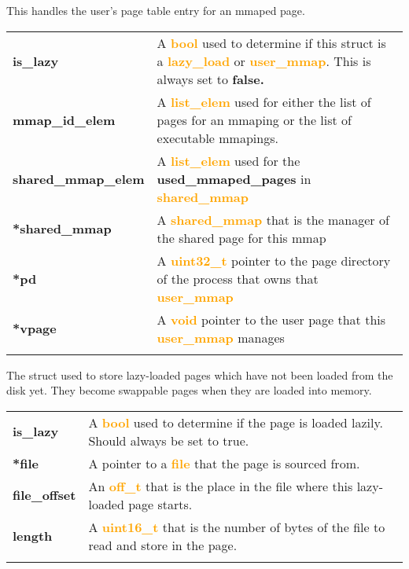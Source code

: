 \documentclass{report}
\newcommand{\file}[1]{\textcolor{YellowGreen}{\textbf{#1}}}
\newcommand{\struct}[1]{\textcolor{orange}{\textbf{#1}}}
\newcommand{\var}[1]{\textcolor{RoyalPurple}{\textbf{#1}}}
\newcommand{\const}[1]{\textcolor{BrickRed}{\textbf{#1}}}
\newcommand{\pintoscode}[4]{}
\newcommand{\pintosfile}[3]{\pintoscode{#1}{#2}{\file{#3}}{#3}}
\begin{document}
				\pintosfile{60}{67}{mmap.c}
				This handles the user's page table entry for an mmaped page. \\
				\begin{center}
					\begin{tabular}{l p{10cm}}
							\vspace*{2mm}
							\var{is\_lazy}            & A \struct{bool} used to determine if this struct is a \struct{lazy\_load} or \struct{user\_mmap}.
							This is always set to \const{false.} \\ \vspace*{2mm}
							\var{mmap\_id\_elem}      & A \struct{list\_elem} used for either the list of pages for an mmaping or the list of executable mmapings. \\ \vspace*{2mm}
							\var{shared\_mmap\_elem}  & A \struct{list\_elem} used for the \var{used\_mmaped\_pages} in \struct{shared\_mmap} \\ \vspace*{2mm}
							\var{*shared\_mmap}       & A \struct{shared\_mmap} that is the manager of the shared page for this mmap \\ \vspace*{2mm}
							\var{*pd}                 & A \struct{uint32\_t} pointer to the page directory of the process that owns that \struct{user\_mmap} \\ \vspace*{2mm}
							\var{*vpage}              & A \struct{void} pointer to the user page that this \struct{user\_mmap} manages \\ \vspace*{2mm}
					\end{tabular}
				\end{center}

				\pintosfile{8}{13}{lazy.c}
				The struct used to store lazy-loaded pages which have not been loaded from the disk yet. They become swappable pages when
				they are loaded into memory.  \\
				\begin{center}
					\begin{tabular}{l p{10cm}}
							\vspace*{2mm}
							\var{is\_lazy}        	& A \struct{bool} used to determine if the page is loaded lazily. Should always be set to true. \\ \vspace*{2mm}
							\var{*file}      		& A pointer to a \struct{file} that the page is sourced from. \\ \vspace*{2mm}
							\var{file\_offset}  	& An \struct{off\_t} that is the place in the file where this lazy-loaded page starts. \\ \vspace*{2mm}
							\var{length}       		& A \struct{uint16\_t} that is the number of bytes of the file to read and store in the page. \\ \vspace*{2mm}
					\end{tabular}
				\end{center}
\end{document}
